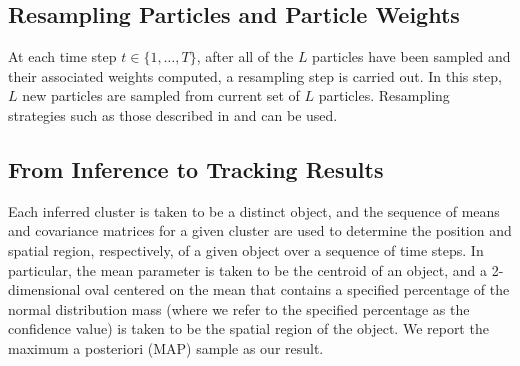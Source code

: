 \documentclass[twocolumn, final]{svjour3}
\begin{document}


\subsection{Resampling Particles and Particle Weights}
\label{sec:resample}

At each time step $t \in \{ 1, \ldots, T \}$, after all of the $L$ particles have been sampled and their associated weights computed, a resampling step is carried out. In this step, $L$ new particles are sampled from current set of $L$ particles.
Resampling strategies such as those described in \cite{gasthaus_thesis} and \cite{douc2005comparison} can be used.


\subsection{From Inference to Tracking Results}
\label{sec:inferencetotrackingresults}

Each inferred cluster is taken to be a distinct object, and the sequence of means and covariance matrices for a given cluster are used to determine the position and spatial region, respectively, of a given object over a sequence of time steps. In particular, the mean parameter is taken to be the centroid of an object, and a 2-dimensional oval centered on the mean that contains a specified percentage of the normal distribution mass (where we refer to the specified percentage as the confidence value) is taken to be the spatial region of the object. We report the maximum a posteriori (MAP) sample as our result.
\end{document}
